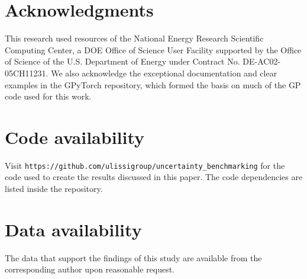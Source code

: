 \documentclass[]{achemso}
\begin{document}
\section*{Acknowledgments} This research used resources of the National Energy Research Scientific Computing Center, a DOE Office of Science User Facility supported by the Office of Science of the U.S. Department of Energy under Contract No. DE-AC02-05CH11231. %
We also acknowledge the exceptional documentation and clear examples in the GPyTorch\cite{Gardner2018} repository, which formed the basis on much of the \gls{GP} code used for this work.

\section*{Code availability} Visit \texttt{https://github.com/ulissigroup/uncertainty\_benchmarking} for the code used to create the results discussed in this paper.
The code dependencies are listed inside the repository.

\section*{Data availability} The data that support the findings of this study are available from the corresponding author upon reasonable request.



\clearpage

\end{document}
